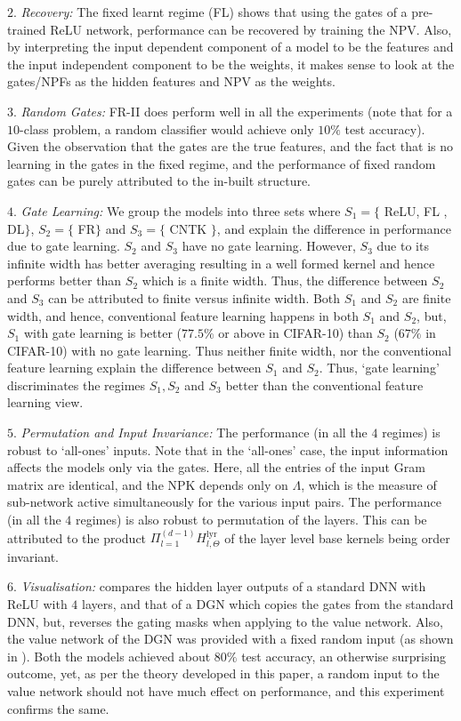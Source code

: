 \indent\quad $2.$ \emph{Recovery:} The fixed learnt regime  (FL) shows that using the gates of a pre-trained ReLU network, performance can be recovered by training the NPV. Also, by interpreting the input dependent component of a model to be the features and the input independent component to be the weights, it makes sense to look at the gates/NPFs as the hidden features and NPV as the weights.%

\indent\quad $3.$ \emph{Random Gates:} FR-II does perform well in all the experiments (note that for a $10$-class problem, a random classifier would achieve only $10\%$ test accuracy). Given the observation that the gates are the true features, and the fact that is no learning in the gates in the fixed regime, and the performance of fixed random gates can be purely attributed to the in-built structure.

\indent\quad $4.$ \emph{Gate Learning:} We group the models into three sets where $S_1=\{$ ReLU, FL , DL$\}$, $S_2=\{$ FR$\}$ and $S_3=\{$ CNTK $\}$, and explain the difference in performance due to gate learning.
 $S_2$ and $S_3$ have no gate learning. However,  $S_3$ due to its infinite width has better averaging resulting in a well formed kernel and hence performs better than $S_2$ which is a finite width. Thus, the difference between $S_2$ and $S_3$ can be attributed to finite versus infinite width. Both $S_1$ and $S_2$ are finite width, and hence, conventional feature learning happens in both $S_1$ and $S_2$, but, $S_1$ with gate learning is better ($77.5\%$ or above in CIFAR-10) than $S_2$ ($67\%$ in CIFAR-10) with no gate learning. Thus neither finite width, nor the conventional feature learning explain the difference between $S_1$ and $S_2$. Thus, `gate learning' discriminates the regimes $S_1, S_2$ and $S_3$ better than the conventional feature learning view.

\indent\quad $5.$ \emph{Permutation and Input Invariance:} The performance (in all the $4$ regimes) is  robust to `all-ones' inputs. Note that in the `all-ones' case, the input information affects the models only via the gates. Here, all the entries of the input Gram matrix are identical, and the NPK depends only on $\Lambda$, which is the measure of sub-network active simultaneously for the various input pairs. The performance (in all the $4$ regimes) is also robust to permutation of the layers. This can be attributed to the product $\Pi_{l=1}^{(d-1)} H^{\text{lyr}}_{l,\Theta}$ of the layer level base kernels being order invariant.

\indent\quad $6.$ \emph{Visualisation:}  compares the hidden layer outputs of a standard DNN with ReLU with $4$ layers, and that of a DGN which copies the gates from the standard DNN, but, reverses the gating masks when applying to the value network. Also, the value network of the DGN was provided with a fixed random input (as shown in ). Both the models achieved about $80\%$ test accuracy, an otherwise surprising outcome, yet, as per the theory developed in this paper, a random input to the value network should not have much effect on performance, and this experiment confirms the same.



